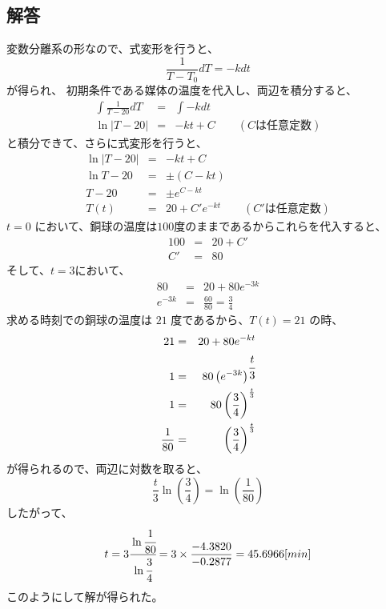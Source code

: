 \documentclass[a4j]{jsarticle}
\begin{document}
\begin{spacing}{1.6}
\begin{qparts}
  \subsection*{解答}
  変数分離系の形なので、式変形を行うと、
  \begin{equation*}
    \frac{1}{T - T_0}dT = -kdt
  \end{equation*}
  が得られ、  初期条件である媒体の温度を代入し、両辺を積分すると、
  \begin{eqnarray*}
        \int \frac{1}{T - 20}dT & = & \int -kdt \\
        \ln |T - 20| & = & -kt + C \qquad (Cは任意定数)
  \end{eqnarray*}
  と積分できて、さらに式変形を行うと、\\
  \begin{eqnarray*}
        \ln |T - 20| & = & -kt + C \\
        \ln T - 20 & = & \pm (C - kt) \\
        T - 20 & = & \pm e ^ {C - kt} \\
        T(t) & = & 20 + C'e ^ {-kt} \qquad (C'は任意定数)
  \end{eqnarray*}
  $ t = 0 $ において、銅球の温度は$100$度のままであるからこれらを代入すると、
  \begin{eqnarray*}
    100 & = & 20 + C' \\
    C' & = & 80
  \end{eqnarray*}
  そして、$ t = 3 $において、
  \begin{eqnarray*}
    80 & = & 20 + 80 e ^ {-3k} \\
    e ^ {-3k} & = & \frac{60}{80} = \frac{3}{4}
  \end{eqnarray*}
  求める時刻での銅球の温度は $ 21 $ 度であるから、$ T(t) = 21 $ の時、
  \begin{eqnarray*}
    21 & = & 20 + 80e ^ {-kt}\\
    1 & = & 80 \left(e ^ {-3k} \right) ^ { \cfrac{t}{3}} \\
    1 & = & 80 \left( \frac{3}{4} \right) ^ {\frac{t}{3}} \\
    \frac{1}{80} & = & \left( \frac{3}{4} \right) ^ {\frac{t}{3}}
  \end{eqnarray*}
  が得られるので、両辺に対数を取ると、
  \begin{equation*}
    \frac{t}{3} \ln \left(\frac{3}{4}\right) = \ln \left(\frac{1}{80}\right)
  \end{equation*}
  したがって、
  \begin{equation*}
    t = 3 \cfrac{\ln \cfrac{1}{80}}{\ln \cfrac{3}{4}} = 3 \times \frac{-4.3820}{-0.2877} = 45.6966[min]
  \end{equation*}
  このようにして解が得られた。

  \end{qparts}
\end{spacing}
\end{document}
